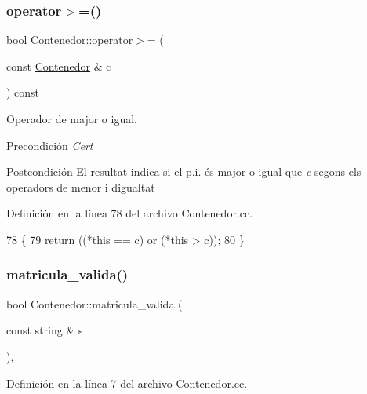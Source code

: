 \subsubsection{\texorpdfstring{operator$>$=()}{operator>=()}}
{\footnotesize\ttfamily bool Contenedor\+::operator$>$= (\begin{DoxyParamCaption}\item[{const \hyperlink{class_contenedor}{Contenedor} \&}]{c }\end{DoxyParamCaption}) const}



Operador de major o igual. 

\begin{DoxyPrecond}{Precondición}
{\itshape Cert} 
\end{DoxyPrecond}
\begin{DoxyPostcond}{Postcondición}
El resultat indica si el p.\+i. és major o igual que {\itshape c} segons els operadors de menor i d\textquotesingle{}igualtat 
\end{DoxyPostcond}


Definición en la línea 78 del archivo Contenedor.\+cc.


\begin{DoxyCode}
78                                                      \{
79   \textcolor{keywordflow}{return} ((*\textcolor{keyword}{this} == c) or (*\textcolor{keyword}{this} > c));
80 \}
\end{DoxyCode}
\mbox{\label{class_contenedor_a5d718d3fba965652412913e5613dabe8}} 
\subsubsection{\texorpdfstring{matricula\+\_\+valida()}{matricula\_valida()}}
{\footnotesize\ttfamily bool Contenedor\+::matricula\+\_\+valida (\begin{DoxyParamCaption}\item[{const string \&}]{s }\end{DoxyParamCaption})\hspace{0.3cm}{\ttfamily [static]}, {\ttfamily [private]}}



Definición en la línea 7 del archivo Contenedor.\+cc.


